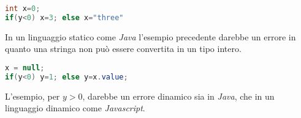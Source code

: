 \begin{lstlisting}[language=Java, caption={Errore statico}]
int x=0;
if(y<0) x=3; else x="three"
\end{lstlisting}
In un linguaggio statico come \emph{Java} l'esempio precedente darebbe
un errore in quanto una stringa non può essere convertita in un tipo
intero.

\begin{lstlisting}[language=Java, caption={Errore Dinamico}]
x = null;
if(y<0) y=1; else y=x.value;
\end{lstlisting}
L'esempio, per $y>0$, darebbe un errore dinamico sia in \emph{Java}, che
in un linguaggio dinamico come \emph{Javascript}.
